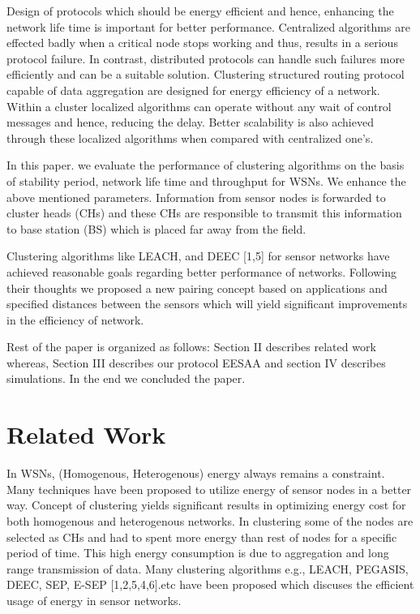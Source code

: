 \documentclass[journal]{IEEEtran}
\begin{document}
Design of protocols which should be energy efficient and hence, enhancing the network life time is important for better performance. Centralized algorithms are effected badly when a critical node stops working and thus, results in a serious protocol failure. In contrast, distributed protocols can handle such failures more efficiently and can be a suitable solution. Clustering structured routing protocol capable of data aggregation are designed for energy efficiency of a network. Within a cluster localized algorithms can operate without any wait of control messages and hence, reducing the delay. Better scalability is also achieved through these localized algorithms when compared with centralized one's.

In this paper. we evaluate the performance of clustering algorithms on the basis of stability period, network life time and throughput for WSNs. We enhance the above mentioned parameters. Information from sensor nodes is forwarded to cluster heads (CHs) and these CHs are responsible to transmit this information to base station (BS) which is placed far away from the field.

Clustering algorithms like LEACH, and DEEC  [1,5] for sensor networks have achieved reasonable goals regarding better performance of networks. Following their thoughts we proposed a new pairing concept based on applications and specified distances between the sensors which will yield significant improvements in the efficiency of network.

Rest of the paper is organized as follows: Section II describes related work whereas, Section III  describes our protocol EESAA and section IV describes simulations. In the end we concluded the paper.

\section{Related Work}
In WSNs, (Homogenous, Heterogenous) energy always remains a constraint. Many techniques have been proposed to utilize energy of sensor nodes in a better way. Concept of clustering yields significant results in optimizing energy cost for both homogenous and heterogenous networks. In clustering some of the nodes are selected as CHs and had to spent more energy than rest of nodes for a specific period of time. This high energy consumption is due to aggregation and long range transmission of data. Many clustering algorithms e.g., LEACH, PEGASIS, DEEC, SEP, E-SEP [1,2,5,4,6].etc have been proposed which discuses the efficient usage of energy in sensor networks.
\end{document}
